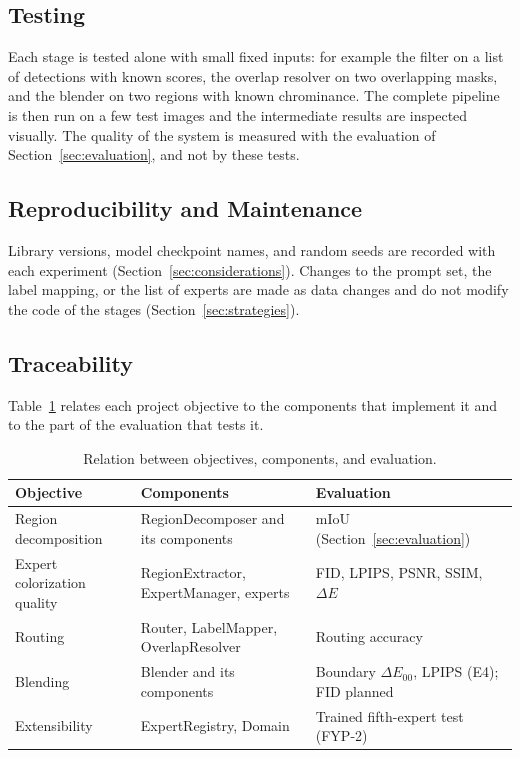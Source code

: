 \documentclass{FastFyp}
\begin{document}
\subsection{Testing}

Each stage is tested alone with small fixed inputs: for example the filter on a list of detections with known scores, the overlap resolver on two overlapping masks, and the blender on two regions with known chrominance. The complete pipeline is then run on a few test images and the intermediate results are inspected visually. The quality of the system is measured with the evaluation of Section~\ref{sec:evaluation}, and not by these tests.

\subsection{Reproducibility and Maintenance}

Library versions, model checkpoint names, and random seeds are recorded with each experiment (Section~\ref{sec:considerations}). Changes to the prompt set, the label mapping, or the list of experts are made as data changes and do not modify the code of the stages (Section~\ref{sec:strategies}).

\subsection{Traceability}

Table~\ref{tab:traceability} relates each project objective to the components that implement it and to the part of the evaluation that tests it.

\begin{table}[htbp]
    \centering
    \caption{Relation between objectives, components, and evaluation.}
    \label{tab:traceability}
    \begin{tabular}{p{3.4cm}p{5.4cm}p{4.2cm}}
        \hline
        \textbf{Objective} & \textbf{Components} & \textbf{Evaluation} \\
        \hline
        Region decomposition & RegionDecomposer and its components & mIoU (Section~\ref{sec:evaluation}) \\
        Expert colorization quality & RegionExtractor, ExpertManager, experts & FID, LPIPS, PSNR, SSIM, $\Delta E$ \\
        Routing & Router, LabelMapper, OverlapResolver & Routing accuracy \\
        Blending & Blender and its components & Boundary $\Delta E_{00}$, LPIPS (E4); FID planned \\
        Extensibility & ExpertRegistry, Domain & Trained fifth-expert test (FYP-2) \\
        \hline
    \end{tabular}
\end{table}
\end{document}
